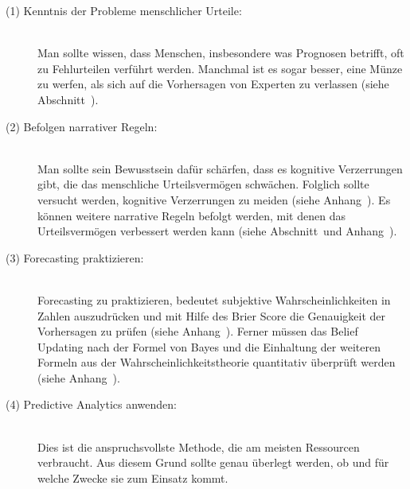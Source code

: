 \begin{description}

\item[(1) Kenntnis der Probleme menschlicher Urteile:] \hfill \\
Man sollte wissen, dass Menschen, insbesondere was Prognosen betrifft, oft zu Fehlurteilen verführt werden.
Manchmal ist es sogar besser, eine Münze zu werfen, als sich auf die Vorhersagen von Experten zu verlassen
(siehe Abschnitt~\xcom).

\item[(2) Befolgen narrativer Regeln:] \hfill \\
Man sollte sein Bewusstsein dafür schärfen, dass es kognitive Verzerrungen gibt, die das menschliche Urteilsvermögen
schwächen. Folglich sollte versucht werden, kognitive Verzerrungen zu meiden (siehe Anhang~\xcom). Es können weitere
narrative Regeln befolgt werden, mit denen das Urteilsvermögen verbessert werden kann (siehe Abschnitt~\xcom und %
Anhang~\xcom).

\item[(3) Forecasting praktizieren:] \hfill \\
Forecasting zu praktizieren, bedeutet subjektive Wahrscheinlichkeiten in Zahlen auszudrücken
und mit Hilfe des Brier Score die Genauigkeit der Vorhersagen zu prüfen (siehe Anhang~\xcom). Ferner müssen
das Belief Updating nach der Formel von Bayes und die Einhaltung der weiteren Formeln aus der Wahrscheinlichkeitstheorie
quantitativ überprüft werden (siehe Anhang~\xcom).

\item[(4) Predictive Analytics anwenden:] \hfill \\ 
Dies ist die anspruchsvollste Methode, die am meisten Ressourcen verbraucht.
Aus diesem Grund sollte genau überlegt werden, ob und für welche Zwecke sie
zum Einsatz kommt.

\end{description}

